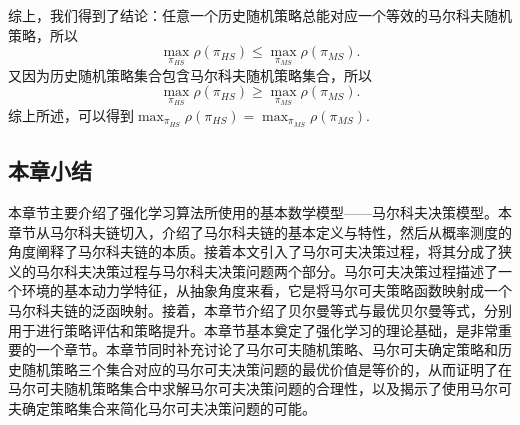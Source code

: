 综上，我们得到了结论：任意一个历史随机策略总能对应一个等效的马尔科夫随机策略，所以
\begin{equation}
    \max_{\pi_{HS}}\rho(\pi_{HS}) \le \max_{\pi_{MS}} \rho(\pi_{MS}).
\end{equation}
又因为历史随机策略集合包含马尔科夫随机策略集合，所以
\begin{equation}
    \max_{\pi_{HS}}\rho(\pi_{HS}) \ge \max_{\pi_{MS}} \rho(\pi_{MS}).
\end{equation}
综上所述，可以得到$\max_{\pi_{HS}}\rho(\pi_{HS}) = \max_{\pi_{MS}}\rho(\pi_{MS})$.

\subsection{本章小结}
本章节主要介绍了强化学习算法所使用的基本数学模型——马尔科夫决策模型。本章节从马尔科夫链切入，介绍了马尔科夫链的基本定义与特性，然后从概率测度的角度阐释了马尔科夫链的本质。接着本文引入了马尔可夫决策过程，将其分成了狭义的马尔科夫决策过程与马尔科夫决策问题两个部分。马尔可夫决策过程描述了一个环境的基本动力学特征，从抽象角度来看，它是将马尔可夫策略函数映射成一个马尔科夫链的泛函映射。接着，本章节介绍了贝尔曼等式与最优贝尔曼等式，分别用于进行策略评估和策略提升。本章节基本奠定了强化学习的理论基础，是非常重要的一个章节。本章节同时补充讨论了马尔可夫随机策略、马尔可夫确定策略和历史随机策略三个集合对应的马尔可夫决策问题的最优价值是等价的，从而证明了在马尔可夫随机策略集合中求解马尔可夫决策问题的合理性，以及揭示了使用马尔可夫确定策略集合来简化马尔可夫决策问题的可能。